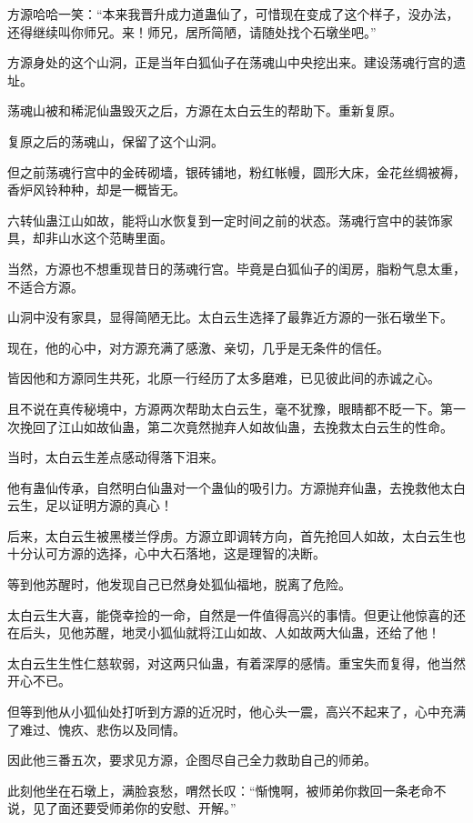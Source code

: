 \begin{this_body}
方源哈哈一笑：“本来我晋升成力道蛊仙了，可惜现在变成了这个样子，没办法，还得继续叫你师兄。来！师兄，居所简陋，请随处找个石墩坐吧。”

方源身处的这个山洞，正是当年白狐仙子在荡魂山中央挖出来。建设荡魂行宫的遗址。

荡魂山被和稀泥仙蛊毁灭之后，方源在太白云生的帮助下。重新复原。

复原之后的荡魂山，保留了这个山洞。

但之前荡魂行宫中的金砖砌墙，银砖铺地，粉红帐幔，圆形大床，金花丝绸被褥，香炉风铃种种，却是一概皆无。

六转仙蛊江山如故，能将山水恢复到一定时间之前的状态。荡魂行宫中的装饰家具，却非山水这个范畴里面。

当然，方源也不想重现昔日的荡魂行宫。毕竟是白狐仙子的闺房，脂粉气息太重，不适合方源。

山洞中没有家具，显得简陋无比。太白云生选择了最靠近方源的一张石墩坐下。

现在，他的心中，对方源充满了感激、亲切，几乎是无条件的信任。

皆因他和方源同生共死，北原一行经历了太多磨难，已见彼此间的赤诚之心。

且不说在真传秘境中，方源两次帮助太白云生，毫不犹豫，眼睛都不眨一下。第一次挽回了江山如故仙蛊，第二次竟然抛弃人如故仙蛊，去挽救太白云生的性命。

当时，太白云生差点感动得落下泪来。

他有蛊仙传承，自然明白仙蛊对一个蛊仙的吸引力。方源抛弃仙蛊，去挽救他太白云生，足以证明方源的真心！

后来，太白云生被黑楼兰俘虏。方源立即调转方向，首先抢回人如故，太白云生也十分认可方源的选择，心中大石落地，这是理智的决断。

等到他苏醒时，他发现自己已然身处狐仙福地，脱离了危险。

太白云生大喜，能侥幸捡的一命，自然是一件值得高兴的事情。但更让他惊喜的还在后头，见他苏醒，地灵小狐仙就将江山如故、人如故两大仙蛊，还给了他！

太白云生生性仁慈软弱，对这两只仙蛊，有着深厚的感情。重宝失而复得，他当然开心不已。

但等到他从小狐仙处打听到方源的近况时，他心头一震，高兴不起来了，心中充满了难过、愧疚、悲伤以及同情。

因此他三番五次，要求见方源，企图尽自己全力救助自己的师弟。

此刻他坐在石墩上，满脸哀愁，喟然长叹：“惭愧啊，被师弟你救回一条老命不说，见了面还要受师弟你的安慰、开解。”


\end{this_body}
